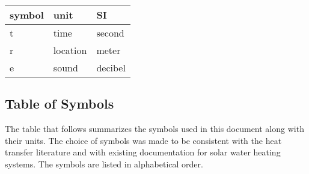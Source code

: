 \documentclass[12pt]{article}
\begin{document}
\renewcommand{\arraystretch}{1.2}
  \noindent \begin{tabular}{l l l}
    \toprule
    \textbf{symbol} & \textbf{unit} & \textbf{SI}\\
    \midrule
    \si t & time & second\\
    \si r & location & meter\\
    \si e & sound & decibel\\
    \bottomrule
  \end{tabular}

%


\subsection{Table of Symbols}

The table that follows summarizes the symbols used in this document along with
their units.  The choice of symbols was made to be consistent with the heat
transfer literature and with existing documentation for solar water heating
systems.  The symbols are listed in alphabetical order.
\end{document}
